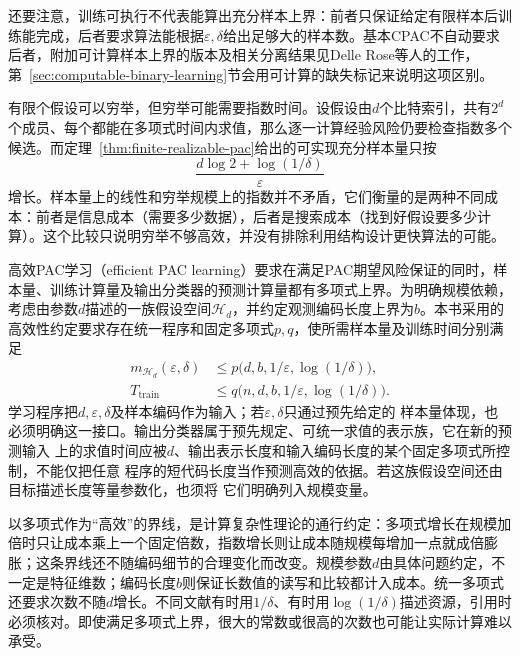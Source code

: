 还要注意，训练可执行不代表能算出充分样本上界：前者只保证给定有限样本后训练能完成，后者要求算法能根据$\varepsilon,\delta$给出足够大的样本数。基本CPAC不自动要求后者，附加可计算样本上界的版本及相关分离结果见Delle Rose等人的工作，第~\ref{sec:computable-binary-learning}节会用可计算的缺失标记来说明这项区别。

有限个假设可以穷举，但穷举可能需要指数时间。设假设由$d$个比特索引，共有$2^d$个成员、每个都能在多项式时间内求值，那么逐一计算经验风险仍要检查指数多个候选。而定理~\ref{thm:finite-realizable-pac}给出的可实现充分样本量只按
\[
 \frac{d\log2+\log(1/\delta)}{\varepsilon}
\]
增长。样本量上的线性和穷举规模上的指数并不矛盾，它们衡量的是两种不同成本：前者是信息成本（需要多少数据），后者是搜索成本（找到好假设要多少计算）。这个比较只说明穷举不够高效，并没有排除利用结构设计更快算法的可能。

\begin{definition}[高效PAC学习]
\label{def:efficient-pac-learning}
高效PAC学习（efficient PAC learning）要求在满足PAC期望风险保证的同时，样本量、训练计算量及输出分类器的预测计算量都有多项式上界。为明确规模依赖，考虑由参数$d$描述的一族假设空间$\mathcal H_d$，并约定观测编码长度上界为$b$。本书采用的高效性约定要求存在统一程序和固定多项式$p,q$，使所需样本量及训练时间分别满足
\begin{equation}
 \begin{aligned}
 m_{\mathcal H_d}(\varepsilon,\delta)
 &\leq p\bigl(d,b,1/\varepsilon,\log(1/\delta)\bigr),\\
 T_{\mathrm{train}}
 &\leq q\bigl(n,d,b,1/\varepsilon,\log(1/\delta)\bigr).
 \end{aligned}
 \label{eq:efficient-pac-resources}
\end{equation}
学习程序把$d,\varepsilon,\delta$及样本编码作为输入；若$\varepsilon,\delta$只通过预先给定的
样本量体现，也必须明确这一接口。输出分类器属于预先规定、可统一求值的表示族，它在新的预测输入
上的求值时间应被$d$、输出表示长度和输入编码长度的某个固定多项式所控制，不能仅把任意
程序的短代码长度当作预测高效的依据。若这族假设空间还由目标描述长度等量参数化，也须将
它们明确列入规模变量。
\end{definition}

以多项式作为“高效”的界线，是计算复杂性理论的通行约定：多项式增长在规模加倍时只让成本乘上一个固定倍数，指数增长则让成本随规模每增加一点就成倍膨胀；这条界线还不随编码细节的合理变化而改变。规模参数$d$由具体问题约定，不一定是特征维数；编码长度$b$则保证长数值的读写和比较都计入成本。统一多项式还要求次数不随$d$增长。不同文献有时用$1/\delta$、有时用$\log(1/\delta)$描述资源，引用时必须核对。即使满足多项式上界，很大的常数或很高的次数也可能让实际计算难以承受。

